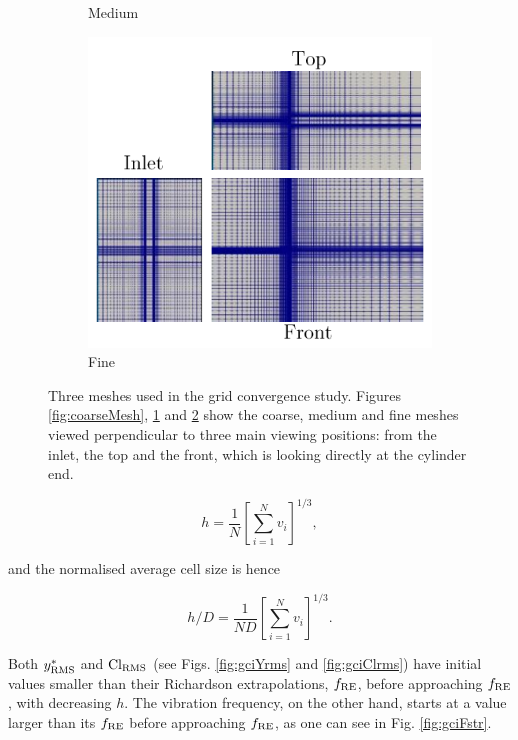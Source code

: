 \documentclass[oneside]{utmthesis}
\begin{document}
\begin{figure}
\begin{subfigure}[h]{0.3\textwidth}
    \caption{Medium}
    \label{fig:mediumMesh}
  \end{subfigure}
  \hfill
  \begin{subfigure}[h]{0.3\textwidth}
    \includegraphics[width=\textwidth]{figs/figure6c}
    \caption{Fine}
    \label{fig:fineMesh}
  \end{subfigure}

  \caption{Three meshes used in the grid convergence study. Figures \ref{fig:coarseMesh}, \ref{fig:mediumMesh} and \ref{fig:fineMesh} show the coarse, medium and fine meshes viewed perpendicular to three main viewing positions: from the inlet, the top and the front, which is looking directly at the cylinder end.} \label{fig:convergenceStudy}
\end{figure}

\begin{equation}
  h = \frac{1}{N} \left [ \sum_{i=1}^{N} v_{i} \right ]^{1/3},
  \label{eq:averageCellSize}
\end{equation}

\noindent and the normalised average cell size is hence 


\begin{equation}
  h/D = \frac{1}{ND} \left [ \sum_{i=1}^{N} v_{i} \right ]^{1/3}.
  \label{eq:normAveCellSize}
\end{equation}

\noindent Both $y^{*}_{\text{RMS}}$ and $\text{Cl}_{\text{RMS}}$ (see Figs. \ref{fig:gciYrms} and \ref{fig:gciClrms}) have initial values smaller than their Richardson extrapolations, $f_{\text{RE}}$, before approaching $f_{\text{RE}}$, with decreasing $h$. The vibration frequency, on the other hand, starts at a value larger than its $f_{\text{RE}}$ before approaching $f_{\text{RE}}$, as one can see in Fig. \ref{fig:gciFstr}.
\end{document}
